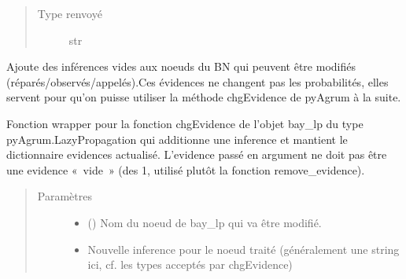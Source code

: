 \documentclass[letterpaper,10pt,french]{sphinxmanual}
\begin{document}
\begin{fulllineitems}
\begin{fulllineitems}
\begin{quote}
\begin{description}
\item[{Type renvoyé}] \leavevmode
str

\end{description}\end{quote}

\end{fulllineitems}


\begin{fulllineitems}
\label{\detokenize{index:DecisionTheoreticTroubleshooting.TroubleShootingProblem._start_bay_lp}}
Ajoute des inférences vides aux noeuds du BN qui peuvent être modifiés
(réparés/observés/appelés).Ces évidences ne changent pas les
probabilités, elles servent pour qu’on puisse utiliser la méthode
chgEvidence de pyAgrum à la suite.

\end{fulllineitems}


\begin{fulllineitems}
\label{\detokenize{index:DecisionTheoreticTroubleshooting.TroubleShootingProblem.add_evidence}}
Fonction wrapper pour la fonction chgEvidence de l’objet bay\_lp du
type pyAgrum.LazyPropagation qui additionne une inference et mantient
le dictionnaire evidences actualisé. L’evidence passé en argument ne
doit pas être une evidence « vide » (des 1, utilisé plutôt la fonction
remove\_evidence).
\begin{quote}\begin{description}
\item[{Paramètres}] \leavevmode\begin{itemize}
\item {} 
 () \textendash{} Nom du noeud de bay\_lp qui va être modifié.

\item {} 
 \textendash{} Nouvelle inference pour le noeud traité (généralement
une string ici, cf. les types acceptés par chgEvidence)


\end{itemize}
\end{description}
\end{quote}
\end{fulllineitems}
\end{fulllineitems}
\end{document}
